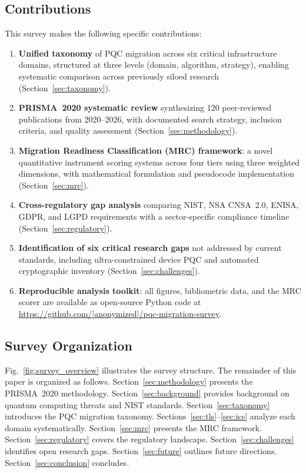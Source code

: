 \documentclass[journal]{IEEEtran}
\begin{document}
\subsection{Contributions}

This survey makes the following specific contributions:
\begin{enumerate}
  \item \textbf{Unified taxonomy} of PQC migration across six critical
  infrastructure domains, structured at three levels (domain, algorithm,
  strategy), enabling systematic comparison across previously siloed research
  (Section~\ref{sec:taxonomy}).
  \item \textbf{PRISMA~2020 systematic review} synthesizing 120 peer-reviewed
  publications from 2020--2026, with documented search strategy, inclusion
  criteria, and quality assessment (Section~\ref{sec:methodology}).
  \item \textbf{Migration Readiness Classification (MRC) framework}: a novel
  quantitative instrument scoring systems across four tiers using three weighted
  dimensions, with mathematical formulation and pseudocode implementation
  (Section~\ref{sec:mrc}).
  \item \textbf{Cross-regulatory gap analysis} comparing NIST, NSA CNSA~2.0,
  ENISA, GDPR, and LGPD requirements with a sector-specific compliance
  timeline (Section~\ref{sec:regulatory}).
  \item \textbf{Identification of six critical research gaps} not addressed by
  current standards, including ultra-constrained device PQC and automated
  cryptographic inventory (Section~\ref{sec:challenges}).
  \item \textbf{Reproducible analysis toolkit}: all figures, bibliometric data,
  and the MRC scorer are available as open-source Python code at
  \url{https://github.com/[anonymized]/pqc-migration-survey}.
\end{enumerate}

\subsection{Survey Organization}

Fig.~\ref{fig:survey_overview} illustrates the survey structure. The remainder
of this paper is organized as follows. Section~\ref{sec:methodology} presents
the PRISMA~2020 methodology. Section~\ref{sec:background} provides background
on quantum computing threats and NIST standards. Section~\ref{sec:taxonomy}
introduces the PQC migration taxonomy. Sections~\ref{sec:tls}--\ref{sec:ics}
analyze each domain systematically. Section~\ref{sec:mrc} presents the MRC
framework. Section~\ref{sec:regulatory} covers the regulatory landscape.
Section~\ref{sec:challenges} identifies open research gaps. Section~\ref{sec:future}
outlines future directions. Section~\ref{sec:conclusion} concludes.
\end{document}
